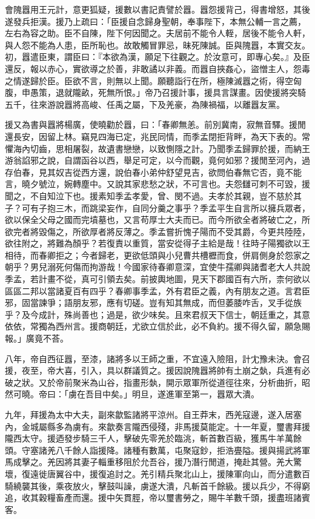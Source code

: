 \begin{pinyinscope}
會隗囂用王元計，意更狐疑，援數以書記責譬於囂。囂怨援背己，得書增怒，其後遂發兵拒漢。援乃上疏曰：「臣援自念歸身聖朝，奉事陛下，本無公輔一言之薦，左右為容之助。臣不自陳，陛下何因聞之。夫居前不能令人輊，居後不能令人軒，與人怨不能為人患，臣所恥也。故敢觸冒罪忌，昧死陳誠。臣與隗囂，本實交友。初，囂遣臣東，謂臣曰：『本欲為漢，願足下往觀之。於汝意可，即專心矣。』及臣還反，報以赤心，實欲導之於善，非敢譎以非義。而囂自挾姦心，盜憎主人，怨毒之情遂歸於臣。臣欲不言，則無以上聞。願聽詣行在所，極陳滅囂之術，得空匈腹，申愚策，退就隴畝，死無所恨。」帝乃召援計事，援具言謀畫。因使援將突騎五千，往來游說囂將高峻、任禹之屬，下及羌豪，為陳禍福，以離囂友黨。

援又為書與囂將楊廣，使曉勸於囂，曰：「春卿無恙。前別冀南，寂無音驛。援閒還長安，因留上林。竊見四海已定，兆民同情，而季孟閉拒背畔，為天下表的。常懼海內切齒，思相屠裂，故遺書戀戀，以致惻隱之計。乃聞季孟歸罪於援，而納王游翁諂邪之說，自謂函谷以西，舉足可定，以今而觀，竟何如邪？援閒至河內，過存伯春，見其奴吉從西方還，說伯春小弟仲舒望見吉，欲問伯春無它否，竟不能言，曉夕號泣，婉轉塵中。又說其家悲愁之狀，不可言也。夫怨讎可刺不可毀，援聞之，不自知泣下也。援素知季孟孝愛，曾、閔不過。夫孝於其親，豈不慈於其子？可有子抱三木，而跳梁妄作，自同分羹之事乎？季孟平生自言所以擁兵眾者，欲以保全父母之國而完墳墓也，又言苟厚士大夫而已。而今所欲全者將破亡之，所欲完者將毀傷之，所欲厚者將反薄之。季孟嘗折愧子陽而不受其爵，今更共陸陸，欲往附之，將難為顏乎？若復責以重質，當安從得子主給是哉！往時子陽獨欲以王相待，而春卿拒之；今者歸老，更欲低頭與小兒曹共槽櫪而食，併肩側身於怨家之朝乎？男兒溺死何傷而拘游哉！今國家待春卿意深，宜使牛孺卿與諸耆老大人共說季孟，若計畫不從，真可引領去矣。前披輿地圖，見天下郡國百有六所，柰何欲以區區二邦以當諸夏百有四乎？春卿事季孟，外有君臣之義，內有朋友之道。言君臣邪，固當諫爭；語朋友邪，應有切磋。豈有知其無成，而但萎腇咋舌，叉手從族乎？及今成計，殊尚善也；過是，欲少味矣。且來君叔天下信士，朝廷重之，其意依依，常獨為西州言。援商朝廷，尤欲立信於此，必不負約。援不得久留，願急賜報。」廣竟不荅。

八年，帝自西征囂，至漆，諸將多以王師之重，不宜遠入險阻，計冘豫未決。會召援，夜至，帝大喜，引入，具以群議質之。援因說隗囂將帥有土崩之埶，兵進有必破之狀。又於帝前聚米為山谷，指畫形埶，開示眾軍所從道徑往來，分析曲折，昭然可曉。帝曰：「虜在吾目中矣。」明旦，遂進軍至第一，囂眾大潰。

九年，拜援為太中大夫，副來歙監諸將平涼州。自王莽末，西羌寇邊，遂入居塞內，金城屬縣多為虜有。來歙奏言隴西侵殘，非馬援莫能定。十一年夏，璽書拜援隴西太守。援迺發步騎三千人，擊破先零羌於臨洮，斬首數百級，獲馬牛羊萬餘頭。守塞諸羌八千餘人詣援降。諸種有數萬，屯聚寇鈔，拒浩亹隘。援與揚武將軍馬成擊之。羌因將其妻子輜重移阻於允吾谷，援乃潛行閒道，掩赴其營。羌大驚壞，復遠徙唐翼谷中，援復追討之。羌引精兵聚北山上，援陳軍向山，而分遣數百騎繞襲其後，乘夜放火，擊鼓叫譟，虜遂大潰，凡斬首千餘級。援以兵少，不得窮追，收其穀糧畜產而還。援中矢貫脛，帝以璽書勞之，賜牛羊數千頭，援盡班諸賓客。


\end{pinyinscope}
